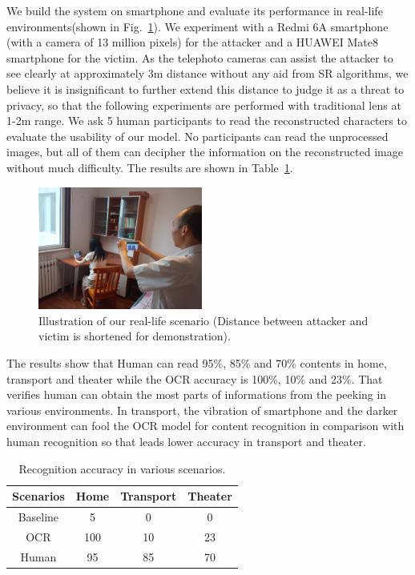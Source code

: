 We build the system on smartphone and evaluate its performance in real-life environments(shown in Fig.~\ref{fig-reallife}). We experiment with a Redmi 6A smartphone (with a camera of 13 million pixels) for the attacker and a HUAWEI Mate8 smartphone for the victim. As the telephoto cameras can assist the attacker to see clearly at approximately 3m distance without any aid from SR algorithms, we believe it is insignificant to further extend this distance to judge it as a threat to privacy, so that the following experiments are performed with traditional lens at 1-2m range. We ask 5 human participants to read the reconstructed characters to evaluate the usability of our model. No participants can read the unprocessed images, but all of them can decipher the information on the reconstructed image without much difficulty. The results are shown in Table~\ref{table-scenarios}.
\begin{figure}
	\centering
	\includegraphics[width=0.48\textwidth]{pic/reallife.jpg}
    \caption{Illustration of our real-life scenario (Distance between attacker and victim is shortened for demonstration).}
	\label{fig-reallife}
\end{figure}

The results show that Human can read 95\%, 85\% and 70\% contents in home, transport and theater while the OCR accuracy is 100\%, 10\% and 23\%. That verifies human can obtain the most parts of informations from the peeking in various environments. In transport, the vibration of smartphone and the darker environment can fool the OCR model for content recognition in comparison with human recognition so that leads lower accuracy in transport and theater.

\begin{table}[!t]
    \centering
    \caption{Recognition accuracy in various scenarios.}
    \begin{tabular}{@{}cccc@{}}
        \toprule
    Scenarios & Home & Transport & Theater \\ \midrule
    Baseline & 5 & 0 & 0\\ 
    \midrule
    OCR & 100 & 10 & 23\\ 
    Human & 95 & 85 & 70\\ \bottomrule
    \end{tabular}
    \label{table-scenarios}
\end{table}

